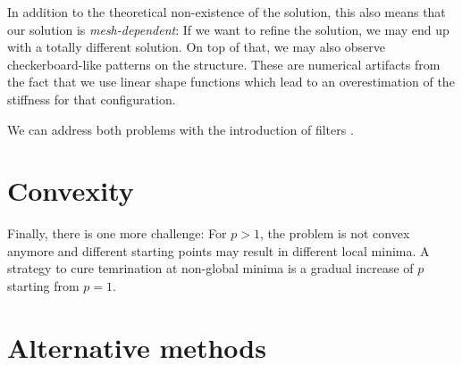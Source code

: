 In addition to the theoretical non-existence of the solution, this also means that our solution is \emph{mesh-dependent}: If we want to refine the solution, we may end up with a totally different solution. On top of that, we may also observe checkerboard-like patterns on the structure. These are numerical artifacts from the fact that we use linear shape functions which lead to an overestimation of the stiffness for that configuration.

We can address both problems with the introduction of filters \cite{Harzheim2014, Lazarov2011}.



\section{Convexity}
Finally, there is one more challenge: For $p>1$, the problem is not convex anymore and different starting points may result in different local minima. A strategy to cure temrination at non-global minima is a gradual increase of $p$ starting from $p=1$.

\section{Alternative methods}




 